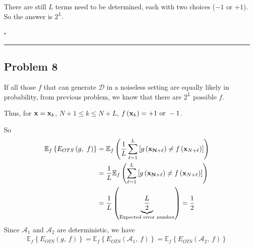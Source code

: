 \documentclass[12pt]{article}
\newcommand*{\QEDB}{\hfill\ensuremath{\square}}
\newcommand{\CBrackets}[1]{\left\{#1\right\}}
\newcommand{\SBrackets}[1]{\left[#1\right]}
\newcommand{\ParTh}[1]{\left(#1\right)}
\newcommand{\BF}[1]{{\bf#1}}
\newcommand{\Divide}[2]{\left.#1\middle/#2\right.}
\newcommand{\horrule}[1]{\rule{\linewidth}{#1}}
\begin{document}
There are still $L$ terms need to be determined, each with two choices ($-1$ or $+1$). So the answer is $2^L$.

\QEDB

\horrule{0.5pt}

\subsection*{Problem 8}

If all those $f$ that can generate $\mathcal{D}$ in a noiseless setting are equally likely in probability, from previous problem, we know that there are $2^L$ possible $f$.

Thus, for $\BF{x}=\BF{x}_k$, $N+1\leq k\leq N+L$, $f\ParTh{\BF{x}_k}=+1\text{ or }-1$.

So
\begin{align}
\mathbb{E}_f\CBrackets{E_{OTS}\ParTh{g,~f}}&=\mathbb{E}_f\ParTh{\dfrac{1}{L}\sum_{\ell=1}^{L}\SBrackets{g\ParTh{\BF{x_{N+\ell}}}\neq f\ParTh{\BF{x}_{N+\ell}}}}
\\
&=\dfrac{1}{L}\mathbb{E}_f\ParTh{\sum_{\ell=1}^{L}\SBrackets{g\ParTh{\BF{x_{N+\ell}}}\neq f\ParTh{\BF{x}_{N+\ell}}}}\\
&=\dfrac{1}{L}\ParTh{\underbrace{\dfrac{L}{2}}_{\text{Expected error number}}}=\dfrac{1}{2}
\end{align}
Since $\mathcal{A}_1$ and $\mathcal{A}_2$ are deterministic, we have
\begin{align}
\mathbb{E}_f\CBrackets{E_{OTS}\ParTh{g,~f}}=\mathbb{E}_f\CBrackets{E_{OTS}\ParTh{\mathcal{A}_1,~f}}=\mathbb{E}_f\CBrackets{E_{OTS}\ParTh{\mathcal{A}_2,~f}}
\end{align}

\end{document}
